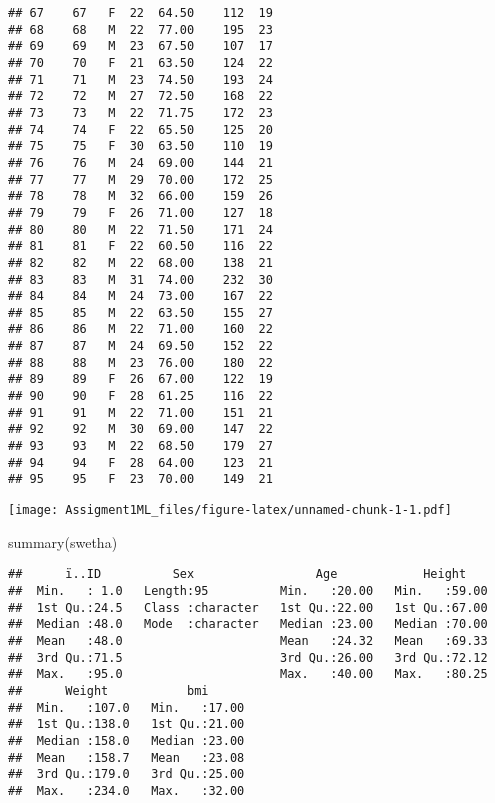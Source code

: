 \documentclass[
]{article}
\newenvironment{Shaded}{\begin{snugshade}}{\end{snugshade}}
\newcommand{\FunctionTok}[1]{\textcolor[rgb]{0.00,0.00,0.00}{#1}}
\newcommand{\NormalTok}[1]{#1}
\newcommand{\SpecialCharTok}[1]{\textcolor[rgb]{0.00,0.00,0.00}{#1}}
\begin{document}
\begin{verbatim}
## 67    67   F  22  64.50    112  19
## 68    68   M  22  77.00    195  23
## 69    69   M  23  67.50    107  17
## 70    70   F  21  63.50    124  22
## 71    71   M  23  74.50    193  24
## 72    72   M  27  72.50    168  22
## 73    73   M  22  71.75    172  23
## 74    74   F  22  65.50    125  20
## 75    75   F  30  63.50    110  19
## 76    76   M  24  69.00    144  21
## 77    77   M  29  70.00    172  25
## 78    78   M  32  66.00    159  26
## 79    79   F  26  71.00    127  18
## 80    80   M  22  71.50    171  24
## 81    81   F  22  60.50    116  22
## 82    82   M  22  68.00    138  21
## 83    83   M  31  74.00    232  30
## 84    84   M  24  73.00    167  22
## 85    85   M  22  63.50    155  27
## 86    86   M  22  71.00    160  22
## 87    87   M  24  69.50    152  22
## 88    88   M  23  76.00    180  22
## 89    89   F  26  67.00    122  19
## 90    90   F  28  61.25    116  22
## 91    91   M  22  71.00    151  21
## 92    92   M  30  69.00    147  22
## 93    93   M  22  68.50    179  27
## 94    94   F  28  64.00    123  21
## 95    95   F  23  70.00    149  21
\end{verbatim}

\begin{Shaded}
\end{Shaded}

\texttt{[image: Assigment1ML\_files/figure-latex/unnamed-chunk-1-1.pdf]}

\begin{Shaded}
\begin{Highlighting}[]
\FunctionTok{summary}\NormalTok{(swetha)}
\end{Highlighting}
\end{Shaded}

\begin{verbatim}
##      ï..ID          Sex                 Age            Height     
##  Min.   : 1.0   Length:95          Min.   :20.00   Min.   :59.00  
##  1st Qu.:24.5   Class :character   1st Qu.:22.00   1st Qu.:67.00  
##  Median :48.0   Mode  :character   Median :23.00   Median :70.00  
##  Mean   :48.0                      Mean   :24.32   Mean   :69.33  
##  3rd Qu.:71.5                      3rd Qu.:26.00   3rd Qu.:72.12  
##  Max.   :95.0                      Max.   :40.00   Max.   :80.25  
##      Weight           bmi       
##  Min.   :107.0   Min.   :17.00  
##  1st Qu.:138.0   1st Qu.:21.00  
##  Median :158.0   Median :23.00  
##  Mean   :158.7   Mean   :23.08  
##  3rd Qu.:179.0   3rd Qu.:25.00  
##  Max.   :234.0   Max.   :32.00
\end{verbatim}
\end{document}
